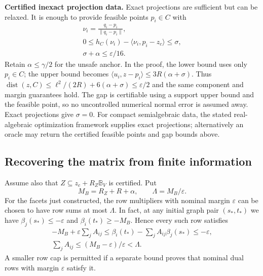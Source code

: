 \documentclass[journal,10pt]{IEEEtran}
\theoremstyle{definition}\newtheorem{definition}{Definition}
\theoremstyle{remark}
\newcommand{\dist}{\operatorname{dist}}
\newcommand{\ball}{\mathbb B_V}
\begin{document}
\textbf{Certified inexact projection data.}
Exact projections are sufficient but can be relaxed. It is enough to provide feasible points $p_i\in C$ with
\[
\begin{gathered}
 \nu_i=\frac{q_i-p_i}{\|q_i-p_i\|},\\
 0\leq h_C(\nu_i)-\langle \nu_i,p_i-z_c\rangle\leq\sigma,\\
 \sigma+\alpha\leq\varepsilon/16.
\end{gathered}
\]
Retain $\alpha\leq\gamma/2$ for the unsafe anchor. In the proof, the lower bound uses only $p_i\in C$; the upper bound becomes
$\langle u_i,z-p_i\rangle\leq3R(\alpha+\sigma)$.
Thus $\dist(z,C)\leq\ell^2/(2R)+6(\alpha+\sigma)\leq\varepsilon/2$ and the same component and margin guarantees hold. The gap is certifiable using a support upper bound and the feasible point, so no uncontrolled numerical normal error is assumed away. Exact projections give $\sigma=0$. For compact semialgebraic data, the stated real-algebraic optimization framework supplies exact projections; alternatively an oracle may return the certified feasible points and gap bounds above.

\subsection{Recovering the matrix from finite information}\label{sec:lp}
Assume also that $Z\subseteq z_c+R_Z\ball$ is certified. Put
\[
 M_B=R_Z+R+\alpha,\qquad \Lambda=M_B/\varepsilon.
\]
For the facets just constructed, the row multipliers with nominal margin $\varepsilon$ can be chosen to have row sums at most $\Lambda$. In fact, at any initial graph pair $(s_*,t_*)$ we have $\beta_j(s_*)\leq-\varepsilon$ and $\beta_i(t_*)\geq-M_B$. Hence every such row satisfies
\[
\begin{gathered}
 -M_B+\varepsilon\sum_j A_{ij}
 \leq\beta_i(t_*)-\sum_j A_{ij}\beta_j(s_*)\leq-\varepsilon,\\
 \sum_jA_{ij}\leq(M_B-\varepsilon)/\varepsilon<\Lambda.
\end{gathered}
\]
A smaller row cap is permitted if a separate bound proves that nominal dual rows with margin $\varepsilon$ satisfy it.
\end{document}
